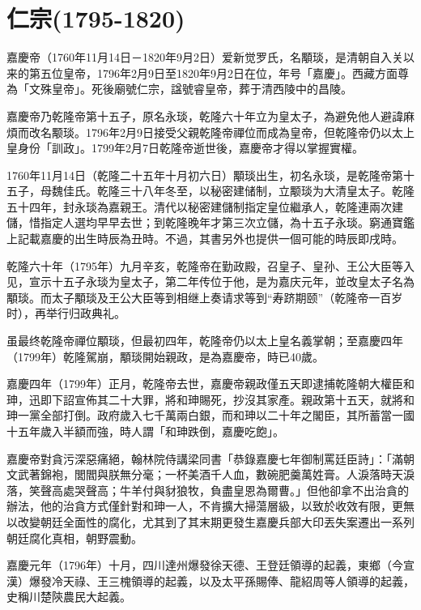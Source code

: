 
\section{仁宗\tiny(1795-1820)}

嘉慶帝（1760年11月14日－1820年9月2日）爱新觉罗氏，名顒琰，是清朝自入关以来的第五位皇帝，1796年2月9日至1820年9月2日在位，年号「嘉慶」。西藏方面尊為「文殊皇帝」。死後廟號仁宗，諡號睿皇帝，葬于清西陵中的昌陵。

嘉慶帝乃乾隆帝第十五子，原名永琰，乾隆六十年立为皇太子，為避免他人避諱麻煩而改名颙琰。1796年2月9日接受父親乾隆帝禪位而成為皇帝，但乾隆帝仍以太上皇身份「訓政」。1799年2月7日乾隆帝逝世後，嘉慶帝才得以掌握實權。

1760年11月14日（乾隆二十五年十月初六日）顒琰出生，初名永琰，是乾隆帝第十五子，母魏佳氏。乾隆三十八年冬至，以秘密建储制，立颙琰为大清皇太子。乾隆五十四年，封永琰為嘉親王。清代以秘密建儲制指定皇位繼承人，乾隆連兩次建儲，惜指定人選均早早去世；到乾隆晚年才第三次立儲，為十五子永琰。窮通寶鑑上記載嘉慶的出生時辰為丑時。不過，其書另外也提供一個可能的時辰即戌時。

乾隆六十年（1795年）九月辛亥，乾隆帝在勤政殿，召皇子、皇孙、王公大臣等入见，宣示十五子永琰为皇太子，第二年传位于他，是为嘉庆元年，並改皇太子名為顒琰。而太子顒琰及王公大臣等到相继上奏请求等到“寿跻期颐”（乾隆帝一百岁时），再举行归政典礼。

虽最终乾隆帝禪位顒琰，但最初四年，乾隆帝仍以太上皇名義掌朝；至嘉慶四年（1799年）乾隆駕崩，顒琰開始親政，是為嘉慶帝，時已40歲。

嘉慶四年（1799年）正月，乾隆帝去世，嘉慶帝親政僅五天即逮捕乾隆朝大權臣和珅，迅即下詔宣佈其二十大罪，將和珅賜死，抄沒其家產。親政第十五天，就將和珅一黨全部打倒。政府歲入七千萬兩白銀，而和珅以二十年之閣臣，其所蓄當一國十五年歲入半額而強，時人謂「和珅跌倒，嘉慶吃飽」。

嘉慶帝對貪污深惡痛絕，翰林院侍講梁同書「恭錄嘉慶七年御制罵廷臣詩」：「滿朝文武著錦袍，閭閻與朕無分毫；一杯美酒千人血，數碗肥羹萬姓膏。人淚落時天淚落，笑聲高處哭聲高；牛羊付與豺狼牧，負盡皇恩為爾曹。」但他卻拿不出治貪的辦法，他的治貪方式僅針對和珅一人，不肯擴大掃蕩層級，以致於收效有限，更無以改變朝廷全面性的腐化，尤其到了其末期更發生嘉慶兵部大印丟失案遷出一系列朝廷腐化真相，朝野震動。

嘉慶元年（1796年）十月，四川達州爆發徐天德、王登廷領導的起義，東鄉（今宣漢）爆發冷天祿、王三槐領導的起義，以及太平孫賜俸、龍紹周等人領導的起義，史稱川楚陝農民大起義。

